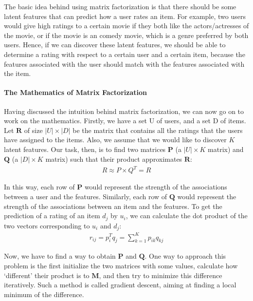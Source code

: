  The basic idea behind using matrix factorization is that there should be some latent features that can predict how a user rates an item. For example, two users would give high ratings to a certain movie if they both like the actors/actresses of the movie, or if the movie is an comedy movie, which is a genre preferred by both users. Hence, if we can discover these latent features, we should be able to determine a rating with respect to a certain user and a certain item, because the features associated with the user should match with the features associated with the item.

\paragraph{The Mathematics of Matrix Factorization}

 Having discussed the intuition behind matrix factorization, we can now go on to work on the mathematics. Firstly, we have a set U of users, and a set D of items. Let $\mathbf{R}$ of size $|U| \times |D|$ be the matrix that contains all the ratings that the users have assigned to the items. Also, we assume that we would like to discover $K$ latent features. Our task, then, is to find two matrices $\mathbf{P}$ (a $|U| \times K$ matrix) and $\mathbf{Q}$ (a $|D| \times K$ matrix) such that their product approximates $\mathbf{R}$:
  \begin{gather*}
    R \approx P \times Q^{T} = \widehat{R}
  \end{gather*}

 In this way, each row of $\mathbf{P}$ would represent the strength of the associations between a user and the features. Similarly, each row of $\mathbf{Q}$ would represent the strength of the associations between an item and the features. To get the prediction of a rating of an item $d_j$ by $u_i$, we can calculate the dot product of the two vectors corresponding to $u_i$ and $d_j$:
  \begin{gather*}
    r_{ij} = p_i^{T}q_j = \sum_{k=1}^{K}p_{ik}q_{kj}
  \end{gather*}

 Now, we have to find a way to obtain $\mathbf{P}$ and $\mathbf{Q}$. One way to approach this problem is the first initialize the two matrices with some values, calculate how `different’ their product is to $\mathbf{M}$, and then try to minimize this difference iteratively. Such a method is called gradient descent, aiming at finding a local minimum of the difference.

